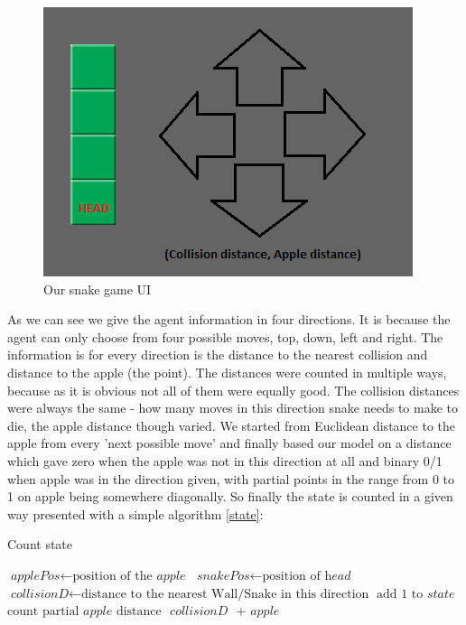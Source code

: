 \documentclass[]{article}
\begin{document}
\begin{figure}[h]
	\centering
	\includegraphics[scale=0.6]{snakeenv}
	\caption{Our snake game UI}
	\label{fig:snakeenv}
\end{figure}

\par As we can see we give the agent information in four directions. It is because the agent can only choose from four possible moves, top, down, left and right. The information is for every direction is the distance to the nearest collision and distance to the apple (the point). The distances were counted in multiple ways, because as it is obvious not all of them were equally good. The collision distances were always the same - how many moves in this direction snake needs to make to die, the apple distance though varied. We started from Euclidean distance to the apple from every 'next possible move' and finally based our model on a distance which gave zero when the apple was not in this direction at all and binary 0/1 when apple was in the direction given, with partial points in the range from 0 to 1 on apple being somewhere diagonally. So finally the state is counted in a given way presented with a simple algorithm \ref{state}:


\begin{algorithm}	
	\caption{Count state}\label{state}	
	\begin{algorithmic}[1]
		\State $\textit{applePos} \gets \text{position of the }\textit{apple}$
		\State $\textit{snakePos} \gets \text{position of }\textit{head}$
		\State $\textit{collisionD} \gets \text{distance to the nearest Wall/Snake in this direction}$
		\EndFor
		\State $\text{add 1 to }\textit{state}$
		\EndIf
		\EndFor
		\State $\text{count partial } \textit{apple} \text{ distance }$
		\EndIf
		\Return $\textit{collisionD }\text{ + }\textit{apple}$
		\EndProcedure
	\end{algorithmic}
\end{algorithm}
\end{document}
